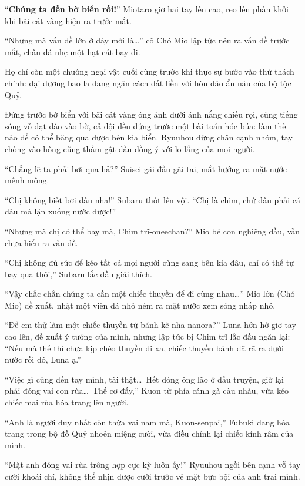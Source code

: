 \documentclass[../main.tex]{subfiles}
\begin{document}
``\textbf{Chúng ta đến bờ biển rồi!}'' Miotaro giơ hai tay lên cao, reo lên phấn khởi khi bãi cát vàng hiện ra trước mắt.

``Nhưng mà vấn đề lớn ở đây mới là\dots'' cô Chó Mio lập tức nêu ra vấn đề trước mắt, chân đá nhẹ một hạt cát bay đi.

Họ chỉ còn một chướng ngại vật cuối cùng trước khi thực sự bước vào thử thách chính: đại dương bao la đang ngăn cách đất liền với hòn đảo ẩn náu của bộ tộc Quỷ.

Đứng trước bờ biển với bãi cát vàng óng ánh dưới ánh nắng chiếu rọi, cùng tiếng sóng vỗ dạt dào vào bờ, cả đội đều đứng trước một bài toán hóc búa: làm thế nào để có thể băng qua được bên kia biển. Ryuuhou dừng chân cạnh nhóm, tay chống vào hông cũng thầm gật đầu đồng ý với lo lắng của mọi người.

``Chẳng lẽ ta phải bơi qua hả?'' Suisei gãi đầu gãi tai, mắt hướng ra mặt nước mênh mông.

``Chị không biết bơi đâu nha!'' Subaru thốt lên vội. ``Chị là chim, chứ đâu phải cá đâu mà lặn xuống nước được!''

``Nhưng mà chị có thể bay mà, Chim trĩ-oneechan?'' Mio bé con nghiêng đầu, vẫn chưa hiểu ra vấn đề.

``Chị không đủ sức để kéo tất cả mọi người cùng sang bên kia đâu, chỉ có thể tự bay qua thôi,'' Subaru lắc đầu giải thích.

``Vậy chắc chắn chúng ta cần một chiếc thuyền để đi cùng nhau\dots'' Mio lớn (Chó Mio) đề xuất, nhặt một viên đá nhỏ ném ra mặt nước xem sóng nhấp nhô.

``Để em thử làm một chiếc thuyền từ bánh kê nha-nanora?'' Luna hớn hở giơ tay cao lên, đề xuất ý tưởng của mình, nhưng lập tức bị Chim trĩ lắc đầu ngăn lại: ``Nếu mà thế thì chưa kịp chèo thuyền đi xa, chiếc thuyền bánh đã rã ra dưới nước rồi đó, Luna ạ.''

\il

``Việc gì cũng đến tay mình, tài thật\dots\ Hết đóng ông lão ở đầu truyện, giờ lại phải đóng vai con rùa\dots\ Thế cơ đấy,'' Kuon từ phía cánh gà càu nhàu, vừa kéo chiếc mai rùa hóa trang lên người.

``Anh là người duy nhất còn thừa vai nam mà, Kuon-senpai,'' Fubuki đang hóa trang trong bộ đồ Quỷ nhoẻn miệng cười, vừa điều chỉnh lại chiếc kính râm của mình.

``Mặt anh đóng vai rùa trông hợp cực kỳ luôn ấy!'' Ryuuhou ngồi bên cạnh vỗ tay cười khoái chí, không thể nhịn được cười trước vẻ mặt bực bội của anh trai mình.
\end{document}
